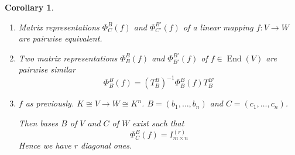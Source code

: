 \documentclass[a4paper,landscape,twocolumn]{article}
\newtheorem{cor}{Corollary}[section]
\DeclareMathOperator\End{End} %
\begin{document}
\begin{cor}
  \begin{enumerate}
    \item
      Matrix representations $\Phi_C^B(f)$ and $\Phi_{C'}^{B'}(f)$ of a linear mapping
      $f: V \to W$ are pairwise equivalent.
    \item
      Two matrix representations $\Phi_B^B(f)$ and $\Phi_{B'}^{B'}(f)$ of $f \in \End(V)$
      are pairwise similar
      \[ \Phi_B^B(f) = \left(T_B^B\right)^{-1} \Phi_B^{B}(f) T_B^{B'} \]
    \item
      $f$ as previously. $K \cong V \to W \cong K^n$. $B = (b_1, \ldots, b_n)$ and $C = (c_1, \ldots, c_n)$.

      Then bases $B$ of $V$ and $C$ of $W$ exist such that
      \[ \Phi_C^B(f) = I_{m \times n}^{(r)} \]
      Hence we have $r$ diagonal ones.
  \end{enumerate}
\end{cor}

\clearpage
\begin{otherlanguage}{ngerman}
\printindex[German]
\end{otherlanguage}
\printindex[English]
\end{document}
